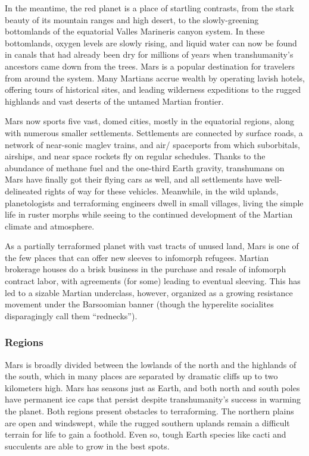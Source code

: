In the meantime, the red planet is a place of startling contrasts, from the stark beauty of its mountain 
ranges and high desert, to the slowly-greening bottomlands of the equatorial Valles Marineris canyon 
system. In these bottomlands, oxygen levels are 
slowly rising, and liquid water can now be found in 
canals that had already been dry for millions of years 
when transhumanity's ancestors came down from 
the trees. Mars is a popular destination for travelers from around the system. Many Martians accrue 
wealth by operating lavish hotels, offering tours of 
historical sites, and leading wilderness expeditions to 
the rugged highlands and vast deserts of the untamed 
Martian frontier.

Mars now sports five vast, domed cities, mostly in 
the equatorial regions, along with numerous smaller 
settlements. Settlements are connected by surface 
roads, a network of near-sonic maglev trains, and air/
spaceports from which suborbitals, airships, and near 
space rockets fly on regular schedules. Thanks to the 
abundance of methane fuel and the one-third Earth 
gravity, transhumans on Mars have finally got their 
flying cars as well, and all settlements have well-delineated rights of way for these vehicles. Meanwhile, 
in the wild uplands, planetologists and terraforming 
engineers dwell in small villages, living the simple life 
in ruster morphs while seeing to the continued development of the Martian climate and atmosphere.

As a partially terraformed planet with vast tracts of 
unused land, Mars is one of the few places that can 
offer new sleeves to infomorph refugees. Martian brokerage houses do a brisk business in the purchase and 
resale of infomorph contract labor, with agreements 
(for some) leading to eventual sleeving. This has led to 
a sizable Martian underclass, however, organized as a 
growing resistance movement under the Barsoomian 
banner (though the hyperelite socialites disparagingly 
call them ``rednecks'').

\subsubsection{Regions}

Mars is broadly divided between the lowlands of the 
north and the highlands of the south, which in many 
places are separated by dramatic cliffs up to two kilometers high. Mars has seasons just as Earth, and both 
north and south poles have permanent ice caps that 
persist despite transhumanity's success in warming the 
planet. Both regions present obstacles to terraforming. 
The northern plains are open and windswept, while 
the rugged southern uplands remain a difficult terrain 
for life to gain a foothold. Even so, tough Earth species like cacti and succulents are able to grow in the 
best spots.

